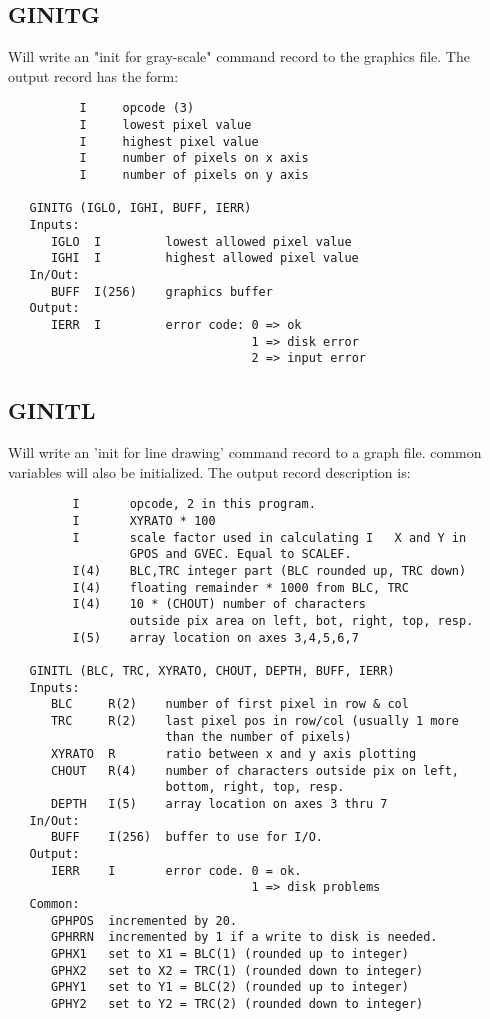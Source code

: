 \subsection{GINITG}
Will write an "init for gray-scale" command record to the
graphics file.  The output record has the form:
\begin{verbatim}
          I     opcode (3)
          I     lowest pixel value
          I     highest pixel value
          I     number of pixels on x axis
          I     number of pixels on y axis

   GINITG (IGLO, IGHI, BUFF, IERR)
   Inputs:
      IGLO  I         lowest allowed pixel value
      IGHI  I         highest allowed pixel value
   In/Out:
      BUFF  I(256)    graphics buffer
   Output:
      IERR  I         error code: 0 => ok
                                  1 => disk error
                                  2 => input error

\end{verbatim}

\subsection{GINITL}
Will write an 'init for line drawing' command record to a
graph file. common variables will also be initialized.
The output record description is:
\begin{verbatim}
         I       opcode, 2 in this program.
         I       XYRATO * 100
         I       scale factor used in calculating I   X and Y in
                 GPOS and GVEC. Equal to SCALEF.
         I(4)    BLC,TRC integer part (BLC rounded up, TRC down)
         I(4)    floating remainder * 1000 from BLC, TRC
         I(4)    10 * (CHOUT) number of characters
                 outside pix area on left, bot, right, top, resp.
         I(5)    array location on axes 3,4,5,6,7

   GINITL (BLC, TRC, XYRATO, CHOUT, DEPTH, BUFF, IERR)
   Inputs:
      BLC     R(2)    number of first pixel in row & col
      TRC     R(2)    last pixel pos in row/col (usually 1 more
                      than the number of pixels)
      XYRATO  R       ratio between x and y axis plotting
      CHOUT   R(4)    number of characters outside pix on left,
                      bottom, right, top, resp.
      DEPTH   I(5)    array location on axes 3 thru 7
   In/Out:
      BUFF    I(256)  buffer to use for I/O.
   Output:
      IERR    I       error code. 0 = ok.
                                  1 => disk problems
   Common:
      GPHPOS  incremented by 20.
      GPHRRN  incremented by 1 if a write to disk is needed.
      GPHX1   set to X1 = BLC(1) (rounded up to integer)
      GPHX2   set to X2 = TRC(1) (rounded down to integer)
      GPHY1   set to Y1 = BLC(2) (rounded up to integer)
      GPHY2   set to Y2 = TRC(2) (rounded down to integer)
\end{verbatim}

